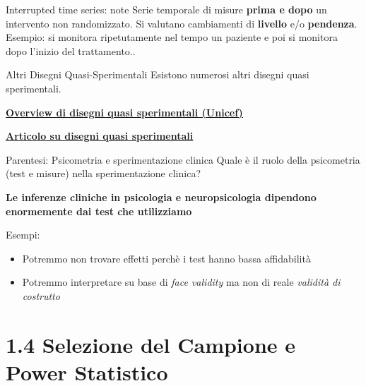 \documentclass[
  ignorenonframetext,
]{beamer}
\providecommand{\tightlist}{%
  \setlength{\itemsep}{0pt}\setlength{\parskip}{0pt}}
\begin{document}
\begin{frame}{Interrupted time series: note}
\label{interrupted-time-series-note}
\small Serie temporale di misure \textbf{prima e dopo} un intervento non
randomizzato. Si valutano cambiamenti di \textbf{livello} e/o
\textbf{pendenza}. Esempio: si monitora ripetutamente nel tempo un
paziente e poi si monitora dopo l'inizio del trattamento..
\end{frame}

\begin{frame}{Altri Disegni Quasi-Sperimentali}
\label{altri-disegni-quasi-sperimentali}
Esistono numerosi altri disegni quasi sperimentali.

\href{https://www.betterevaluation.org/sites/default/files/Quasi-Experimental_Design_and_Methods_ENG.pdf}{\underline{\textbf{Overview di disegni quasi sperimentali (Unicef)}}}

\href{https://pmc.ncbi.nlm.nih.gov/articles/PMC11741180/}{\underline{\textbf{Articolo su disegni quasi sperimentali}}}

\small
\end{frame}

\begin{frame}{Parentesi: Psicometria e sperimentazione clinica}
\label{parentesi-psicometria-e-sperimentazione-clinica}
Quale è il ruolo della psicometria (test e misure) nella sperimentazione
clinica? \pause

\textbf{Le inferenze cliniche in psicologia e neuropsicologia dipendono
enormemente dai test che utilizziamo}

Esempi:

\begin{itemize}
\tightlist
\item
  Potremmo non trovare effetti perchè i test hanno bassa affidabilità
\item
  Potremmo interpretare su base di \emph{face validity} ma non di reale
  \emph{validità di costrutto}
\end{itemize}
\end{frame}

\section{1.4 Selezione del Campione e Power
Statistico}\label{selezione-del-campione-e-power-statistico}
\end{document}
